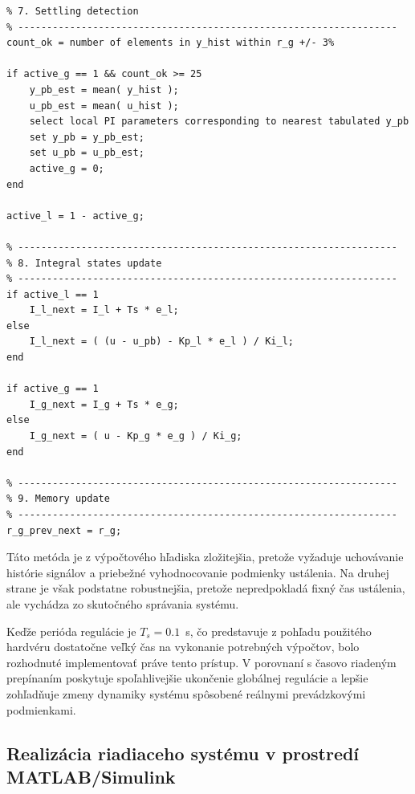 \begin{lstlisting}[style = pseudocode,
caption={Pseudokód prepínania na základe detekcie ustálenia},
label={lst:pi_switch_settling_based}]
% ------------------------------------------------------------------
% 7. Settling detection
% ------------------------------------------------------------------
count_ok = number of elements in y_hist within r_g +/- 3%

if active_g == 1 && count_ok >= 25
    y_pb_est = mean( y_hist );
    u_pb_est = mean( u_hist );
    select local PI parameters corresponding to nearest tabulated y_pb
    set y_pb = y_pb_est;
    set u_pb = u_pb_est;
    active_g = 0;
end

active_l = 1 - active_g;

% ------------------------------------------------------------------
% 8. Integral states update
% ------------------------------------------------------------------
if active_l == 1
    I_l_next = I_l + Ts * e_l;
else
    I_l_next = ( (u - u_pb) - Kp_l * e_l ) / Ki_l;
end

if active_g == 1
    I_g_next = I_g + Ts * e_g;
else
    I_g_next = ( u - Kp_g * e_g ) / Ki_g;
end

% ------------------------------------------------------------------
% 9. Memory update
% ------------------------------------------------------------------
r_g_prev_next = r_g;
\end{lstlisting}

Táto metóda je z výpočtového hľadiska zložitejšia,
pretože vyžaduje uchovávanie histórie signálov
a priebežné vyhodnocovanie podmienky ustálenia.
Na druhej strane je však podstatne robustnejšia,
pretože nepredpokladá fixný čas ustálenia,
ale vychádza zo skutočného správania systému.

Keďže perióda regulácie je $T_s = 0.1$~s,
čo predstavuje z pohľadu použitého hardvéru
dostatočne veľký čas na vykonanie potrebných výpočtov,
bolo rozhodnuté implementovať práve tento prístup.
V porovnaní s časovo riadeným prepínaním
poskytuje spoľahlivejšie ukončenie globálnej regulácie
a lepšie zohľadňuje zmeny dynamiky systému
spôsobené reálnymi prevádzkovými podmienkami.


\subsection{Realizácia riadiaceho systému v prostredí MATLAB/Simulink}
\label{sec:pi_switch_matlab_implementation}

